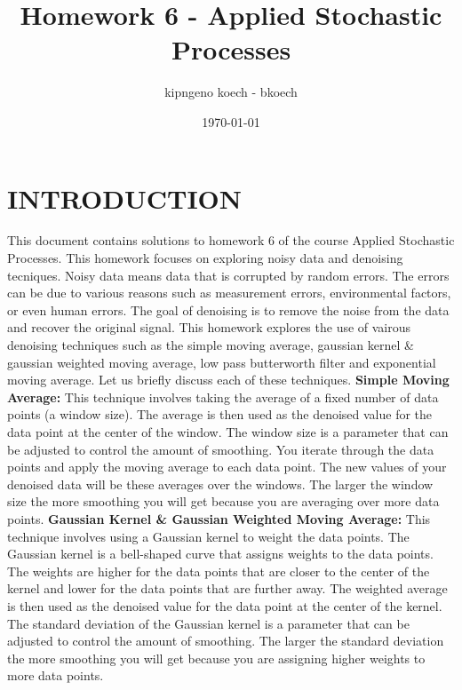 \documentclass[a4paper,12pt]{article} %
\begin{document}
\author{kipngeno koech - bkoech}
\title{Homework 6 - Applied Stochastic Processes}
\date{\today}
\maketitle

\medskip
\section{INTRODUCTION}
This document contains solutions to homework 6 of the course Applied Stochastic Processes. This homework focuses on exploring noisy data and denoising tecniques. Noisy data means data that is corrupted by random errors. The errors can be due to various reasons such as measurement errors, environmental factors, or even human errors. The goal of denoising is to remove the noise from the data and recover the original signal. 
\newline\newline
This homework explores the use of vairous denoising techniques such as the simple moving average, gaussian kernel \& gaussian weighted moving average, low pass butterworth filter and exponential moving average. Let us briefly discuss each of these techniques.
\newline\newline
\textbf{Simple Moving Average:} This technique involves taking the average of a fixed number of data points (a window size). The average is then used as the denoised value for the data point at the center of the window. The window size is a parameter that can be adjusted to control the amount of smoothing. You iterate through the data points and apply the moving average to each data point. The new values of your denoised data will be these averages over the windows. The larger the window size the more smoothing you will get because you are averaging over more data points.
\newline\newline
\textbf{Gaussian Kernel \& Gaussian Weighted Moving Average:} This technique involves using a Gaussian kernel to weight the data points. The Gaussian kernel is a bell-shaped curve that assigns weights to the data points. The weights are higher for the data points that are closer to the center of the kernel and lower for the data points that are further away. The weighted average is then used as the denoised value for the data point at the center of the kernel. The standard deviation of the Gaussian kernel is a parameter that can be adjusted to control the amount of smoothing. The larger the standard deviation the more smoothing you will get because you are assigning higher weights to more data points.
\end{document}
